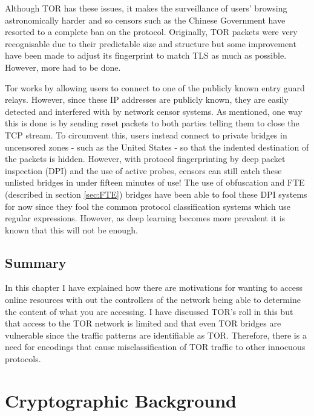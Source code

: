 \documentclass[ %
                    author={Samuel Russell},
                supervisor={Prof. Bogdan Warinschi},
                    degree={MEng},
                     title={Innocuous Ciphertexts},
                  subtitle={The DE-CENSOR Scheme},
                      type={research},
                      year={2018} ]{dissertation}
\begin{document}
Although TOR has these issues, it makes the surveillance of users' browsing astronomically harder and so censors such as the Chinese Government have resorted to a complete ban on the protocol. Originally, TOR packets were very recognisable due to their predictable size and structure but some improvement have been made to adjust its fingerprint to match TLS as much as possible. However, more had to be done.

Tor works by allowing users to connect to one of the publicly known entry guard relays. However, since these IP addresses are publicly known, they are easily detected and interfered with by network censor systems. As mentioned, one way this is done is by sending reset packets to both parties telling them to close the TCP stream.
To circumvent this, users instead connect to private bridges in uncensored zones - such as the United States - so that the indented destination of the packets is hidden. However, with protocol fingerprinting by deep packet inspection (DPI) and the use of active probes, censors can still catch these unlisted bridges in under fifteen minutes of use!
The use of obfuscation and FTE (described in section \ref{sec:FTE}) bridges have been able to fool these DPI systems for now since they fool the common protocol classification systems which use regular expressions. However, as deep learning becomes more prevalent it is known that this will not be enough.

\section{Summary}

In this chapter I have explained how there are motivations for wanting to access online resources  with out the controllers of the network being able to determine the content of what you are accessing. I have discussed TOR's roll in this but that access to the TOR network is limited and that even TOR bridges are vulnerable since the traffic patterns are identifiable as TOR. Therefore, there is a need for encodings that cause misclassification of TOR traffic to other innocuous protocols. 


\chapter{Cryptographic Background}
\label{chap:technical}
\end{document}
